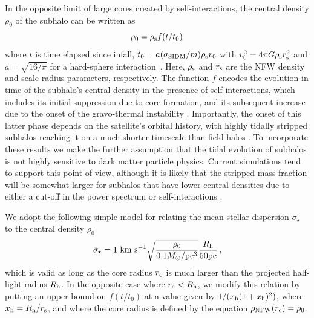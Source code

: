 In the opposite limit of large cores created by self-interactions, the central density $\rho_0$ of the subhalo can be written as \citep{Nishikawa:2019lsc}
\begin{equation}
\rho_0=\rho_{\rm s} f(t/t_0)\,
\end{equation}
where $t$ is time elapsed since infall, $t_0 = a(\sigma_{\rm SIDM}/m)\rho_{\rm s} v_0$ with $v_0^2=4\pi G \rho_{\rm s} r_{\rm s}^2$ and $a=\sqrt{16/\pi}$ for a hard-sphere interaction~\citep{Balberg:2002ue}. Here, $\rho_{\rm s}$ and $r_{\rm s}$ are the NFW density and scale radius parameters, respectively. The function $f$ encodes the evolution in time of the subhalo's central density in the presence of self-interactions, which includes its initial suppression due to core formation, and its subsequent increase due to the onset of the gravo-thermal instability \citep{Ahn:2004xt}. Importantly, the onset of this latter phase depends on the satellite's orbital history, with highly tidally stripped subhalos reaching it on a much shorter timescale than field halos \citep{Nishikawa:2019lsc}. To incorporate these results we make the further assumption that the tidal evolution of subhalos is not highly sensitive to dark matter particle physics. Current simulations tend to support this point of view, although it is likely that the stripped mass fraction will be somewhat larger for subhalos that have lower central densities due to either a cut-off in the power spectrum or self-interactions \citep{Lovell:2013ola,Dooley:2016ajo}. 

We adopt the following simple model for relating the mean stellar dispersion $\bar{\sigma}_\star$ to the central density $\rho_0$ \citep{Wolf:2009tu}
\begin{equation}
\bar{\sigma}_\star = 1 \mathrm{\,\mathrm{\,km}\,\mathrm{\,s}^{-1}} \sqrt{\frac{\rho_0}{0.1 M_\odot/{\rm pc}^3}} \frac{R_{\rm h}}{50 {\rm pc}}\,,
\end{equation}
which is valid as long as the core radius $r_{\rm c}$ is much larger than the projected half-light radius $R_{\rm h}$. In the opposite case where $r_{\rm c} < R_{\rm h}$, we modify this relation by putting an upper bound on $f(t/t_0)$ at a value given by $1/(x_{\rm h}(1+x_{\rm h})^2)$, where $x_{\rm h} = R_{\rm h}/r_{\rm s}$, and where the core radius is defined by the equation $\rho_{\rm NFW}(r_{\rm c}) = \rho_0$.   

